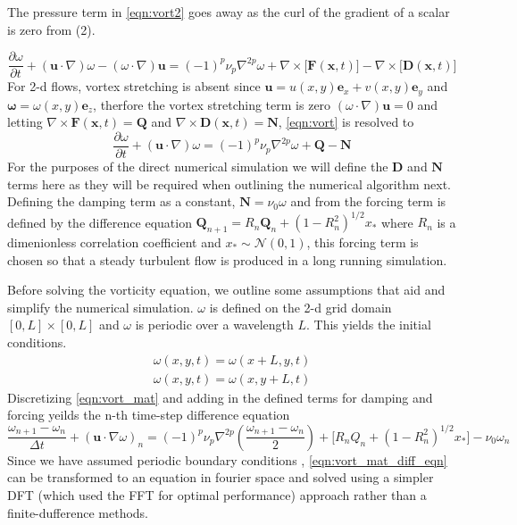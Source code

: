The pressure term in \ref{eqn:vort2} goes away as the curl of the gradient of a scalar is zero from (2). 

\begin{equation}
\label{eqn:vort}
\frac{\partial \omega}{\partial t} + (\mathbf{u} \cdot \nabla)\omega - (\omega \cdot \nabla)\mathbf{u} = (-1)^p \nu_p \nabla^{2 p} \omega + \nabla \times \bigg[\mathbf{F}(\mathbf{x},t)\bigg] - \nabla \times \bigg[\mathbf{D}(\mathbf{x},t) \bigg]
\end{equation}
For 2-d flows, vortex stretching is absent since $\mathbf{u} = u(x,y)\mathbf{e}_{x} + v(x,y)\mathbf{e}_{y}$ and $\mathbf{\omega} = \omega(x,y)\mathbf{e}_{z}$, therfore the vortex stretching term is zero $(\omega \cdot \nabla)\mathbf{u} = 0$
and letting $\nabla \times \mathbf{F}(\mathbf{x},t) = \mathbf{Q}$ and $\nabla \times \mathbf{D}(\mathbf{x},t) = \mathbf{N}$, \ref{eqn:vort} is resolved to 
\begin{equation}
\label{eqn:vort_mat}
\frac{\partial \omega}{\partial t} + (\mathbf{u} \cdot \nabla)\omega = (-1)^p \nu_p \nabla^{2 p} \omega + \mathbf{Q} - \mathbf{N}
\end{equation}
For the purposes of the direct numerical simulation we will define the $\mathbf{D}$ and $\mathbf{N}$ terms here as they will be required when outlining the numerical algorithm next.
Defining the damping term as a constant, $\mathbf{N} = \nu_{0}\omega$ and from \cite{lilly} the forcing term is defined by the difference equation $\mathbf{Q}_{n+1} = R_{n}\mathbf{Q}_{n} + (1 - R^{2}_{n})^{1/2}x_{*}$ where $R_{n}$ is a dimenionless correlation coefficient
and $x_{*} \sim \mathcal{N}(0,1)$, this forcing term is chosen so that a steady turbulent flow is produced in a long running simulation.

Before solving the vorticity equation, we outline some assumptions that aid and simplify the numerical simulation.
$\omega$ is defined on the 2-d grid domain $[0,L] \times [0,L]$ and $\omega$ is periodic over a wavelength $L$. This yields the initial conditions.
\begin{align*}
\omega(x,y,t) = \omega(x + L,y,t)	\\
\omega(x,y,t) = \omega(x,y + L,t)	
\end{align*}
Discretizing \ref{eqn:vort_mat} and adding in the defined terms for damping and forcing yeilds the n-th time-step difference equation
\begin{equation}
\label{eqn:vort_mat_diff_eqn}
\frac{\omega_{n+1} - \omega_{n}}{\Delta t} + \left(\mathbf{u} \cdot \nabla \omega \right)_{n} = (-1)^p \nu_p \nabla^{2p} \left(\frac{\omega_{n+1} - \omega_{n}}{2} \right) + \bigg[R_{n}Q_{n} + (1 - R^{2}_{n})^{1/2}x_{*}\bigg] - \nu_{0} \omega_{n}
\end{equation}
Since we have assumed periodic boundary conditions , \ref{eqn:vort_mat_diff_eqn} can be transformed to an equation in fourier space and solved using a simpler DFT (which used the FFT for optimal performance)
approach rather than a finite-dufference methods.

